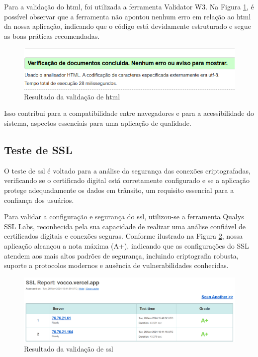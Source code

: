 Para a validação do \ac{html}, foi utilizada a ferramenta Validator W3. Na Figura \ref{fig:html}, é possível observar que a ferramenta não apontou nenhum erro em relação ao \ac{html} da nossa aplicação, indicando que o código está devidamente estruturado e segue as boas práticas recomendadas.

\begin{figure}[ht]
        \centering
\includegraphics[width=1.0\textwidth]{images/html.png}
        \caption{Resultado da validação de html}
        \label{fig:html}
\end{figure}

Isso contribui para a compatibilidade entre navegadores e para a acessibilidade do sistema, aspectos essenciais para uma aplicação de qualidade.

\subsection{Teste de SSL}
O teste de \ac{ssl} é voltado para a análise da segurança das conexões criptografadas, verificando se o certificado digital está corretamente configurado e se a aplicação protege adequadamente os dados em trânsito, um requisito essencial para a confiança dos usuários.

Para validar a configuração e segurança do \ac{ssl}, utilizou-se a ferramenta Qualys SSL Labs, reconhecida pela sua capacidade de realizar uma análise confiável de certificados digitais e conexões seguras. Conforme ilustrado na Figura \ref{fig:ssl}, nossa aplicação alcançou a nota máxima (A+), indicando que as configurações do SSL atendem aos mais altos padrões de segurança, incluindo criptografia robusta, suporte a protocolos modernos e ausência de vulnerabilidades conhecidas.

\begin{figure}[ht]
        \centering
\includegraphics[width=1.0\textwidth]{images/ssl.png}
        \caption{Resultado da validação de ssl}
        \label{fig:ssl}
\end{figure}


